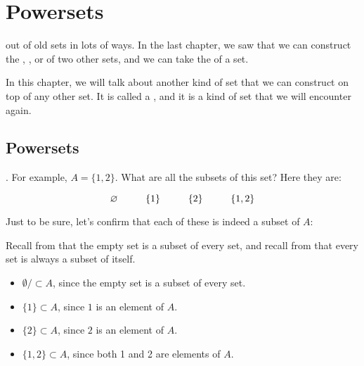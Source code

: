 \documentclass[../../../main.tex]{subfiles}
\begin{document}
\chapter{Powersets}

 out of old sets in lots of ways. In the last chapter, we saw that we can construct the , , or  of two other sets, and we can take the  of a set.

In this chapter, we will talk about another kind of set that we can construct on top of any other set. It is called a , and it is a kind of set that we will encounter again.


\section{Powersets}

. For example, $A = \{ 1, 2 \}$. What are all the subsets of this set? Here they are:

\begin{equation*}
  \emptyset/ \hskip 1cm \{ 1 \} \hskip 1cm \{ 2 \} \hskip 1cm \{ 1, 2 \}
\end{equation*}

Just to be sure, let's confirm that each of these is indeed a subset of $A$:

\begin{aside}
  \begin{remark}
    Recall from  that the empty set is a subset of every set, and recall from  that every set is always a subset of itself.
  \end{remark}
\end{aside}

\begin{itemize}
  \item $\emptyset/ \subset A$, since the empty set is a subset of every set.
  \item $\{ 1 \} \subset A$, since $1$ is an element of $A$.
  \item $\{ 2 \} \subset A$, since $2$ is an element of $A$.
  \item $\{1, 2 \} \subset A$, since both 1 and 2 are elements of $A$.
\end{itemize}
\end{document}
